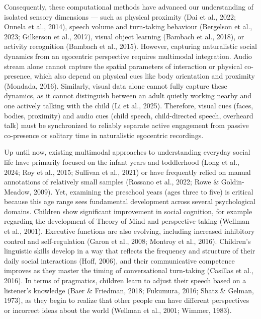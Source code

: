 \documentclass[
  english,
  12pt,
  man,floatsintext]{apa6}
\begin{document}
Consequently, these computational methods have advanced our understanding of isolated sensory dimensions --- such as physical proximity (Dai et al., 2022; Onnela et al., 2014), speech volume and turn-taking behaviour (Bergelson et al., 2023; Gilkerson et al., 2017), visual object learning (Bambach et al., 2018), or activity recognition (Bambach et al., 2015). However, capturing naturalistic social dynamics from an egocentric perspective requires multimodal integration. Audio stream alone cannot capture the spatial parameters of interaction or physical co-presence, which also depend on physical cues like body orientation and proximity (Mondada, 2016). Similarly, visual data alone cannot fully capture these dynamics, as it cannot distinguish between an adult quietly working nearby and one actively talking with the child (Li et al., 2025). Therefore, visual cues (faces, bodies, proximity) and audio cues (child speech, child-directed speech, overheard talk) must be synchronized to reliably separate active engagement from passive co-presence or solitary time in naturalistic egocentric recordings.

Up until now, existing multimodal approaches to understanding everyday social life have primarily focused on the infant years and toddlerhood (Long et al., 2024; Roy et al., 2015; Sullivan et al., 2021) or have frequently relied on manual annotations of relatively small samples (Rossano et al., 2022; Rowe \& Goldin-Meadow, 2009). Yet, examining the preschool years (ages three to five) is critical because this age range sees fundamental development across several psychological domains. Children show significant improvement in social cognition, for example regarding the development of Theory of Mind and perspective-taking (Wellman et al., 2001). Executive functions are also evolving, including increased inhibitory control and self-regulation (Garon et al., 2008; Montroy et al., 2016). Children's linguistic skills develop in a way that reflects the frequency and structure of their daily social interactions (Hoff, 2006), and their communicative competence improves as they master the timing of conversational turn-taking (Casillas et al., 2016). In terms of pragmatics, children learn to adjust their speech based on a listener's knowledge (Baer \& Friedman, 2018; Fukumura, 2016; Shatz \& Gelman, 1973), as they begin to realize that other people can have different perspectives or incorrect ideas about the world (Wellman et al., 2001; Wimmer, 1983).
\end{document}
